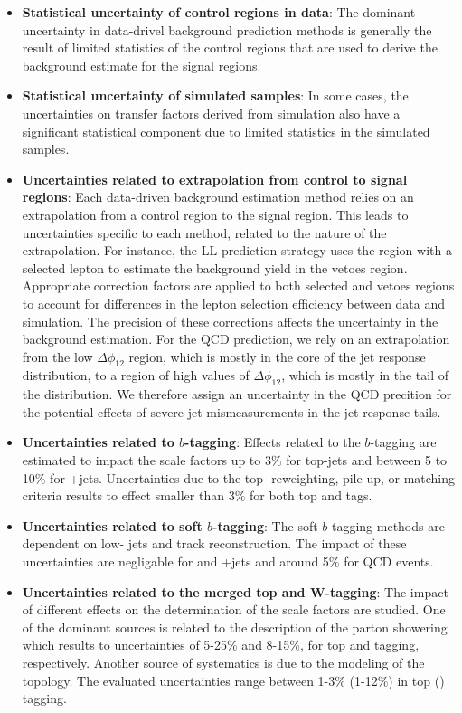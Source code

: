 \begin{itemize}
	\item \textbf{Statistical uncertainty of control regions in data}: The dominant uncertainty in data-drivel background prediction methods is generally the result of limited statistics of the control regions that are used to derive the background estimate for the signal regions.
	\item \textbf{Statistical uncertainty of simulated samples}: In some cases, the uncertainties on transfer factors derived from simulation also have a significant statistical component due to limited statistics in the simulated samples.
	\item \textbf{Uncertainties related to extrapolation from control to signal regions}: Each data-driven background estimation method relies on an extrapolation from a control region to the signal region. This leads to uncertainties specific to each method, related to the nature of the extrapolation. For instance, the LL prediction strategy uses the region with a selected lepton to estimate the background yield in the vetoes region. Appropriate correction factors are applied to both selected and vetoes regions to account for differences in the lepton selection efficiency between data and simulation. The precision of these corrections affects the uncertainty in the background estimation. For the QCD prediction, we rely on an extrapolation from the low $\Delta\phi_{12}$ region, which is mostly in the core of the jet response distribution, to a region of high values of $\Delta\phi_{12}$, which is mostly in the tail of the distribution. We therefore assign an uncertainty in the QCD precition for the potential effects of severe jet mismeasurements in the jet response tails. 
	\item \textbf{Uncertainties related to $b$-tagging}: Effects related to the $b$-tagging are estimated to impact the scale factors up to 3\% for top-jets and between 5 to 10\% for \W+jets. Uncertainties due to the top-\pt{} reweighting, pile-up, or matching criteria results to effect smaller than 3\% for both top and \W{} tags. 
	\item \textbf{Uncertainties related to soft $b$-tagging}: The soft $b$-tagging methods are dependent on low-\pt{} jets and track reconstruction. The impact of these uncertainties are negligable for \ttbar{} and \W+jets and around 5\% for QCD events.
	\item \textbf{Uncertainties related to the merged top and W-tagging}: The impact of different effects on the determination of the scale factors are studied. One of the dominant sources is related to the description of the parton showering which results to uncertainties of 5-25\% and 8-15\%, for top and \W{} tagging, respectively. Another source of systematics is due to the modeling of the \ttbar{} topology. The evaluated uncertainties range between 1-3\% (1-12\%) in top (\W) tagging. 

\end{itemize}
